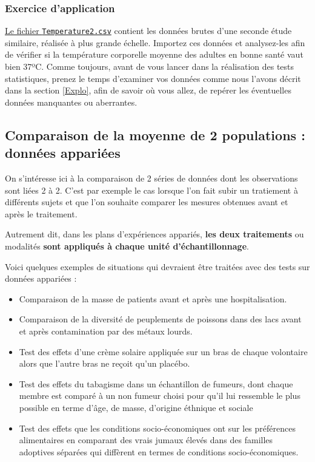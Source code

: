 \documentclass[a4paperpaper,]{article}
\providecommand{\tightlist}{%
  \setlength{\itemsep}{0pt}\setlength{\parskip}{0pt}}
\begin{document}
\hypertarget{exercice-dapplication}{%
\subsubsection{Exercice d'application}\label{exercice-dapplication}}

\href{https://besibo.github.io/Biometrie3/data/Temperature2.csv}{Le fichier \texttt{Temperature2.csv}} contient les données brutes d'une seconde étude similaire, réalisée à plus grande échelle. Importez ces données et analysez-les afin de vérifier si la température corporelle moyenne des adultes en bonne santé vaut bien 37ºC. Comme toujours, avant de vous lancer dans la réalisation des tests statistiques, prenez le temps d'examiner vos données comme nous l'avons décrit dans la section \ref{Explo}, afin de savoir où vous allez, de repérer les éventuelles données manquantes ou aberrantes.

\hypertarget{comparaison-de-la-moyenne-de-2-populations-donnuxe9es-appariuxe9es}{%
\subsection{Comparaison de la moyenne de 2 populations : données appariées}\label{comparaison-de-la-moyenne-de-2-populations-donnuxe9es-appariuxe9es}}

On s'intéresse ici à la comparaison de 2 séries de données dont les observations sont liées 2 à 2. C'est par exemple le cas lorsque l'on fait subir un tratiement à différents sujets et que l'on souhaite comparer les mesures obtenues avant et après le traitement.

Autrement dit, dans les plans d'expériences appariés, \textbf{les deux traitements} ou modalités \textbf{sont appliqués à chaque unité d'échantillonnage}.

Voici quelques exemples de situations qui devraient être traitées avec des tests sur données appariées :

\begin{itemize}
\tightlist
\item
  Comparaison de la masse de patients avant et après une hospitalisation.
\item
  Comparaison de la diversité de peuplements de poissons dans des lacs avant et après contamination par des métaux lourds.
\item
  Test des effets d'une crème solaire appliquée sur un bras de chaque volontaire alors que l'autre bras ne reçoit qu'un placébo.
\item
  Test des effets du tabagisme dans un échantillon de fumeurs, dont chaque membre est comparé à un non fumeur choisi pour qu'il lui ressemble le plus possible en terme d'âge, de masse, d'origine éthnique et sociale
\item
  Test des effets que les conditions socio-économiques ont sur les préférences alimentaires en comparant des vrais jumaux élevés dans des familles adoptives séparées qui diffèrent en termes de conditions socio-économiques.
\end{itemize}
\end{document}
